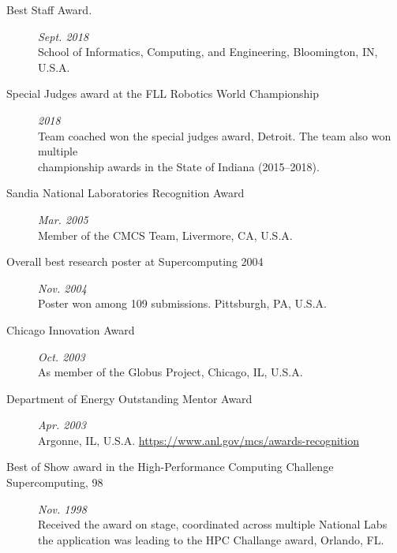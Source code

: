 \documentclass{article}
\begin{document}
\begin{description}
\item[Best Staff Award.] \hfill {\it Sept. 2018} ~\\
  School of Informatics, Computing, and Engineering, Bloomington, IN, U.S.A. 

\item [Special Judges award at the FLL Robotics World Championship] \hfill{\it 2018} ~\\
  Team coached won the special judges award,
  Detroit. The team also won multiple \\
  championship awards in the State of Indiana (2015--2018).

  
\item[Sandia National Laboratories Recognition Award]  \hfill {\it Mar. 2005} ~\\
  Member of the CMCS Team, Livermore, CA, U.S.A.
  
\item[Overall best research poster at Supercomputing 2004] \hfill {\it Nov. 2004} ~\\
  Poster won among 109 submissions. Pittsburgh, PA, U.S.A. 
  
\item[Chicago Innovation Award] \hfill {\it Oct. 2003} ~\\
  As member of the Globus Project, Chicago, IL, U.S.A.
  
\item[Department of Energy Outstanding Mentor Award] \hfill {\it Apr. 2003} ~\\
  Argonne, IL, U.S.A. \url{https://www.anl.gov/mcs/awards-recognition}

  
  
\item[Best of Show award in the High-Performance Computing Challenge Supercomputing‚ 98] \hfill {\it Nov. 1998} ~\\
  Received the award on stage, coordinated across multiple National Labs \\
  the application was leading to the HPC Challange award, Orlando, FL.
  

\end{description}
\end{document}
